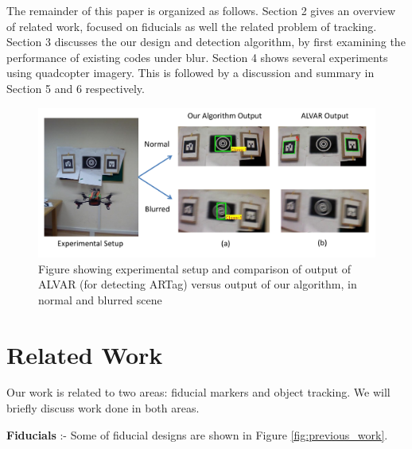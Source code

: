 \documentclass[runningheads]{llncs}
\begin{document}
The remainder of this paper is organized as follows.   Section 2 gives an
overview of related work, focused on fiducials as well the related problem of
tracking.  Section 3 discusses the our design and detection algorithm, by first
examining the performance of existing codes under blur. Section 4 shows several
experiments using quadcopter imagery.  This is followed by a discussion and
summary in Section 5 and 6 respectively.

\begin{figure}
\includegraphics[width=\linewidth]{teaser.pdf}
\caption{Figure showing experimental setup and comparison of
output of ALVAR\cite{alvar} (for detecting ARTag) versus output of our
algorithm, in normal and blurred scene}
\label{fig:teaser}
\end{figure}

\section{Related Work}

Our work is related to two areas: fiducial markers and
object tracking. We will briefly discuss work done in both areas.

\textbf{Fiducials} :- Some of fiducial designs are shown in Figure
\ref{fig:previous_work}.
\end{document}
